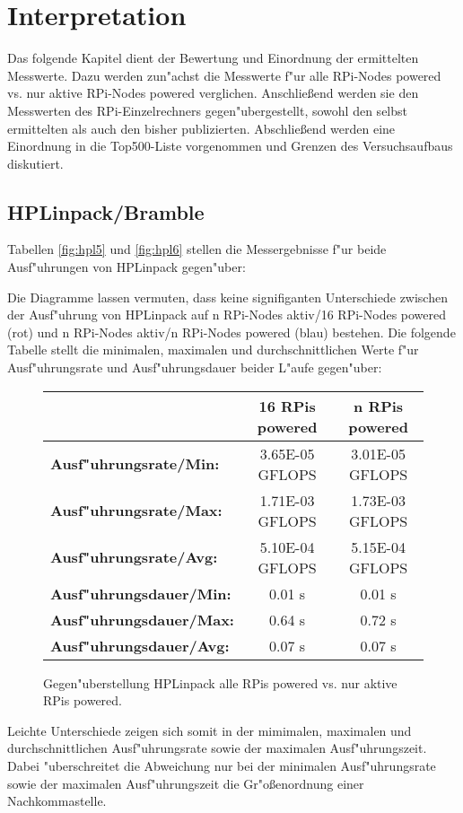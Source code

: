 \chapter{Interpretation}\label{Kap4}

Das folgende Kapitel dient der Bewertung und Einordnung der ermittelten Messwerte. Dazu werden zun"achst die Messwerte f"ur alle RPi-Nodes powered vs. nur aktive RPi-Nodes powered verglichen. Anschlie\ss end werden sie den Messwerten des RPi-Einzelrechners gegen"ubergestellt, sowohl den selbst ermittelten als auch den bisher publizierten. Abschlie\ss end werden eine Einordnung in die Top500-Liste vorgenommen und Grenzen des Versuchsaufbaus diskutiert. 

\section{HPLinpack/Bramble}\label{Interpretation-Linpack}

Tabellen \ref{fig:hpl5} und \ref{fig:hpl6} stellen die Messergebnisse f"ur beide Ausf"uhrungen von HPLinpack gegen"uber: 



\noindent
Die Diagramme lassen vermuten, dass keine signifiganten Unterschiede zwischen der Ausf"uhrung von HPLinpack auf n RPi-Nodes aktiv/16 RPi-Nodes powered (rot) und n RPi-Nodes aktiv/n RPi-Nodes powered (blau) bestehen. Die folgende Tabelle stellt die minimalen, maximalen und durchschnittlichen Werte f"ur Ausf"uhrungsrate und Ausf"uhrungsdauer beider L"aufe gegen"uber: 

\begin{figure}[h!]
  \centering
  \begin{tabular}{|l|c|c|}
    \hline 
     & \textbf{16 RPis powered} & \textbf{n RPis powered}\\ 
    \hline 
    \textbf{Ausf"uhrungsrate/Min:} & 3.65E-05 GFLOPS & 3.01E-05 GFLOPS \\
    \hline 
    \textbf{Ausf"uhrungsrate/Max:} & 1.71E-03 GFLOPS & 1.73E-03 GFLOPS \\
    \hline 
    \textbf{Ausf"uhrungsrate/Avg:} & 5.10E-04 GFLOPS & 5.15E-04 GFLOPS \\
    \hline 
    \textbf{Ausf"uhrungsdauer/Min:} & 0.01 s & 0.01 s \\
    \hline 
    \textbf{Ausf"uhrungsdauer/Max:} & 0.64 s & 0.72 s \\
	\hline 
    \textbf{Ausf"uhrungsdauer/Avg:} & 0.07 s & 0.07 s\\
    \hline
  \end{tabular}
  \caption{Gegen"uberstellung HPLinpack alle RPis powered vs. nur aktive RPis powered.}\label{fig:hpl-vgl}
\end{figure}
\noindent
Leichte Unterschiede zeigen sich somit in der mimimalen, maximalen und durchschnittlichen Ausf"uhrungsrate sowie der maximalen Ausf"uhrungszeit. Dabei "uberschreitet die Abweichung nur bei der minimalen Ausf"uhrungsrate sowie der maximalen Ausf"uhrungszeit die Gr"o\ss enordnung einer Nachkommastelle. 

